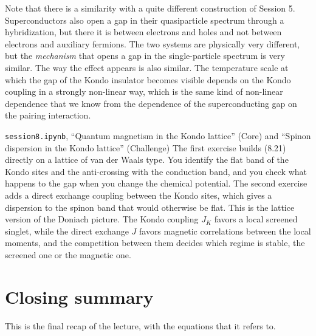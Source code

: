 Note that there is a similarity with a quite different construction of Session 5. Superconductors
also open a gap in their quasiparticle spectrum through a hybridization, but there it is between
electrons and holes and not between electrons and auxiliary fermions. The two systems are
physically very different, but the \emph{mechanism} that opens a gap in the single-particle
spectrum is very similar. The way the effect appears is also similar. The temperature
scale at which the gap of the Kondo insulator becomes visible depends on the Kondo coupling in a
strongly non-linear way, which is the same kind of non-linear dependence that we know from the
dependence of the superconducting gap on the pairing interaction.

\begin{notebookbox}{\texttt{session8.ipynb}, ``Quantum magnetism in the Kondo lattice'' (Core) and ``Spinon dispersion in the Kondo lattice'' (Challenge)}
The first exercise builds (8.21) directly on a lattice of van der Waals type. You identify the flat
band of the Kondo sites and the anti-crossing with the conduction band, and you check what happens
to the gap when you change the chemical potential. The second exercise adds a direct exchange
coupling between the Kondo sites, which gives a dispersion to the spinon band that would otherwise
be flat. This is the lattice version of the Doniach picture. The Kondo coupling $J_K$ favors a
local screened singlet, while the direct exchange $J$ favors magnetic correlations between the local
moments, and the competition between them decides which regime is stable, the screened one or the
magnetic one.
\end{notebookbox}

\section{Closing summary}

This is the final recap of the lecture, with the equations that it refers to.

